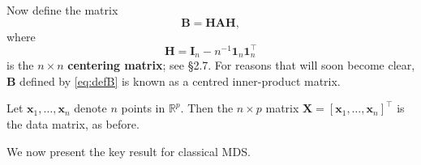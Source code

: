 \documentclass[]{book}
\theoremstyle{definition}
\theoremstyle{definition}
\theoremstyle{definition}
\theoremstyle{remark}
\begin{document}
Now define the matrix
\begin{equation}
{\mathbf B}={\mathbf H} \boldsymbol A{\mathbf H},
\label{eq:defB}
\end{equation}
where
\begin{equation}
{\mathbf H}={\mathbf I}_n -n^{-1}{\mathbf 1}_n {\mathbf 1}_n^\top
\label{eq:defH}
\end{equation}
is the \(n \times n\) \textbf{centering matrix}; see \S 2.7. For reasons that will soon become clear, \(\boldsymbol B\) defined by \eqref{eq:defB} is known as a centred inner-product matrix.

Let \(\boldsymbol x_1, \ldots , \boldsymbol x_n\) denote \(n\) points in \(\mathbb{R}^p\). Then the \(n \times p\) matrix
\(\mathbf X=[\boldsymbol x_1, \ldots , \boldsymbol x_n]^\top\) is the data matrix, as before.

We now present the key result for classical MDS.
\end{document}
